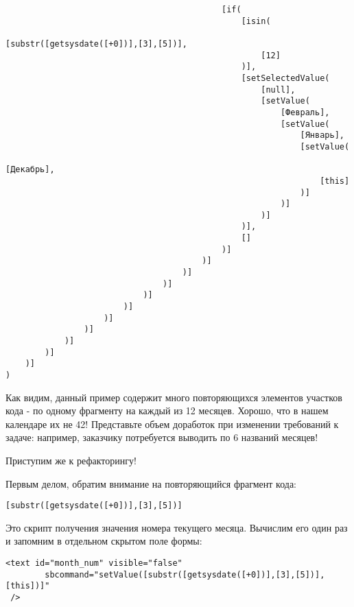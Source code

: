 \documentclass[10pt]{book}
\begin{document}
\begin{verbatim}
                                            [if(
                                                [isin(
                                                    [substr([getsysdate([+0])],[3],[5])],
                                                    [12]
                                                )],
                                                [setSelectedValue(
                                                    [null],
                                                    [setValue(
                                                        [Февраль],
                                                        [setValue(
                                                            [Январь],
                                                            [setValue(
                                                                [Декабрь],
                                                                [this]
                                                            )]
                                                        )]
                                                    )]
                                                )],
                                                []
                                            )]
                                        )]
                                    )]
                                )]
                            )]
                        )]
                    )]
                )]
            )]
        )]
    )]
)
\end{verbatim}

Как видим, данный пример содержит много повторяющихся элементов участков кода - по одному фрагменту на каждый из 12 месяцев. Хорошо, что в нашем календаре их не 42! Представьте объем доработок при изменении требований к задаче: например, заказчику потребуется выводить по 6 названий месяцев!

Приступим же к рефакторингу!

Первым делом, обратим внимание на повторяющийся фрагмент кода:

\begin{verbatim}
[substr([getsysdate([+0])],[3],[5])]
\end{verbatim}

Это скрипт получения значения номера текущего месяца.
Вычислим его один раз и запомним в отдельном скрытом поле формы:

\begin{verbatim}
<text id="month_num" visible="false"
        sbcommand="setValue([substr([getsysdate([+0])],[3],[5])],[this])]" 
 />
\end{verbatim}
\end{document}
